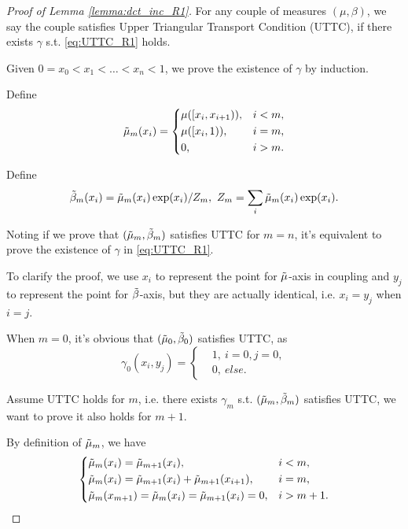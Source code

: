 \documentclass[nohyperref]{article}
\theoremstyle{plain}
\begin{document}
\begin{proof}[Proof of Lemma \ref{lemma:dct_inc_R1}]

For any couple of measures $(\mu, \beta)$, we say the couple satisfies Upper Triangular Transport Condition (UTTC), if there exists $\gamma$ s.t. \eqref{eq:UTTC_R1} holds.

Given $0 = x_0 < x_1 < \dots < x_n < 1$, we prove the existence of $\gamma$ by induction.

Define 
\begin{equation*}
    \Tilde{\mu}_m(x_i) = 
\left\{
\begin{aligned}
    &\mu ([x_i, x_{i+1})),& &i < m, \\
    &\mu ([x_i, 1)),& &i = m, \\
    & 0,& &i > m.
\end{aligned}
\right.
\end{equation*}

Define
$$
\Tilde{\beta}_m (x_i) = \Tilde{\mu}_m (x_i) \exp(x_i) / Z_m,
\  Z_m = \sum_{i} \Tilde{\mu}_m (x_i) \exp (x_i).$$ 

Noting if we prove that $(\Tilde{\mu}_m, \Tilde{\beta}_m)$ satisfies UTTC for $m=n$, it's equivalent to prove the existence of $\gamma$ in \eqref{eq:UTTC_R1}.

To clarify the proof, we use $x_i$ to represent the point for $\Tilde{\mu}$-axis in coupling and $y_j$ to represent the point for $\Tilde{\beta}$-axis, but they are actually identical, i.e. $x_i = y_j$ when $i = j$. 

When $m = 0$, it's obvious that $(\Tilde{\mu}_0, \Tilde{\beta}_0)$ satisfies UTTC, as
$$
\gamma_0 (x_i, y_j) = \left\{
\begin{aligned}
    &1, \ i = 0, j = 0, \\
    &0, \ else.
\end{aligned}
\right.
$$

Assume UTTC holds for $m$, i.e. there exists $\gamma_m$ s.t. $(\Tilde{\mu}_m, \Tilde{\beta}_m)$ satisfies UTTC, we want to prove it also holds for $m+1$.

By definition of $\Tilde{\mu}_m$, we have
\begin{equation*}
    \left\{
    \begin{aligned}
        &\Tilde{\mu}_m (x_i) = \Tilde{\mu}_{m+1} (x_i),& &i < m, \\
        &\Tilde{\mu}_m (x_i) = \Tilde{\mu}_{m+1} (x_i) + \Tilde{\mu}_{m+1} (x_{i+1}),& &i=m, \\
        &\Tilde{\mu}_m (x_{m+1}) = \Tilde{\mu}_m (x_i) = \Tilde{\mu}_{m+1} (x_i) = 0,& &i>m+1. \\
    \end{aligned}
    \right.
\end{equation*}


\end{proof}
\end{document}
